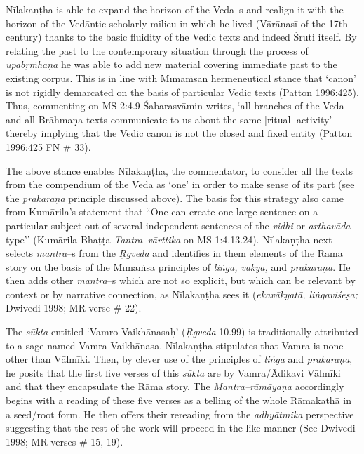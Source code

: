 Nīlakaṇṭha is able to expand the horizon of the Veda–s and realign it with the horizon of the Vedāntic scholarly milieu in which he lived (Vārāṇasī of the 17th century) thanks to the basic fluidity of the Vedic texts and indeed Śruti itself. By relating the past to the contemporary situation through the process of \textit{upabṛṁhaṇa} he was able to add new material covering immediate past to the existing corpus. This is in line with Mīmāṁsan hermeneutical stance that ‘canon’ is not rigidly demarcated on the basis of particular Vedic texts (Patton 1996:425). Thus, commenting on MS 2:4.9 Śabarasvāmin writes, ‘all branches of the Veda and all Brāhmaṇa texts communicate to us about the same [ritual] activity’ thereby implying that the Vedic canon is not the closed and fixed entity (Patton 1996:425 FN \# 33).

The above stance enables Nīlakaṇṭha, the commentator, to consider all the texts from the compendium of the Veda as ‘one’ in order to make sense of its part (see the \textit{prakaraṇa} principle discussed above). The basis for this strategy also came from Kumārila’s statement that “One can create one large sentence on a particular subject out of several independent sentences of the \textit{vidhi} or \textit{arthavāda} type’’ (Kumārila Bhaṭṭa \textit{Tantra–vārttika} on MS 1:4.13.24). Nīlakaṇṭha next selects \textit{mantra}–s from the \textit{Ṛgveda} and identifies in them elements of the Rāma story on the basis of the Mīmāṁsā principles of \textit{liṅga, vākya,} and \textit{prakaraṇa}. He then adds other \textit{mantra}–s which are not so explicit, but which can be relevant by context or by narrative connection, as Nīlakaṇṭha sees it (\textit{ekavākyatā, liṅgaviśeṣa;} Dwivedi 1998; MR verse \# 22).

The \textit{sūkta} entitled ‘Vamro Vaikhānasaḥ’ (\textit{Ṛgveda} 10.99) is traditionally attributed to a sage named Vamra Vaikhānasa. Nīlakaṇṭha stipulates that Vamra is none other than Vālmīki. Then, by clever use of the principles of \textit{liṅga} and \textit{prakaraṇa}, he posits that the first five verses of this \textit{sūkta} are by Vamra/Ādikavi Vālmīki and that they encapsulate the Rāma story. The \textit{Mantra–rāmāyaṇa} accordingly begins with a reading of these five verses as a telling of the whole Rāmakathā in a seed/root form. He then offers their rereading from the \textit{adhyātmika} perspective suggesting that the rest of the work will proceed in the like manner (See Dwivedi 1998; MR verses \# 15, 19).

